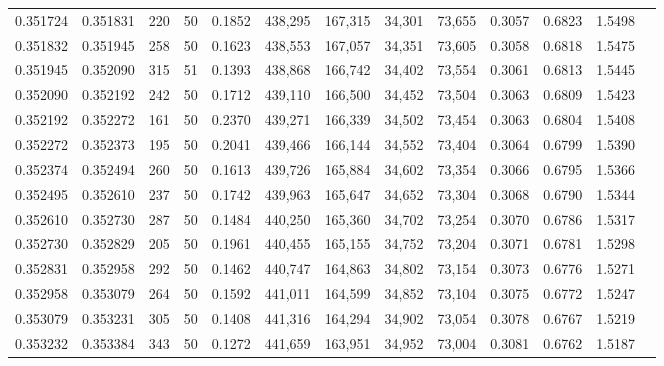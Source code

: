 \begin{tabular}{rrrrrrrrrrrrr}
0.351724 & 0.351831 &   220 &  50 &                                     0.1852 & 438,295 & 167,315 &  34,301 &  73,655 & 0.3057 & 0.6823 & 1.5498 \\
0.351832 & 0.351945 &   258 &  50 &                                     0.1623 & 438,553 & 167,057 &  34,351 &  73,605 & 0.3058 & 0.6818 & 1.5475 \\
0.351945 & 0.352090 &   315 &  51 &                                     0.1393 & 438,868 & 166,742 &  34,402 &  73,554 & 0.3061 & 0.6813 & 1.5445 \\
0.352090 & 0.352192 &   242 &  50 &                                     0.1712 & 439,110 & 166,500 &  34,452 &  73,504 & 0.3063 & 0.6809 & 1.5423 \\
0.352192 & 0.352272 &   161 &  50 &                                     0.2370 & 439,271 & 166,339 &  34,502 &  73,454 & 0.3063 & 0.6804 & 1.5408 \\
0.352272 & 0.352373 &   195 &  50 &                                     0.2041 & 439,466 & 166,144 &  34,552 &  73,404 & 0.3064 & 0.6799 & 1.5390 \\
0.352374 & 0.352494 &   260 &  50 &                                     0.1613 & 439,726 & 165,884 &  34,602 &  73,354 & 0.3066 & 0.6795 & 1.5366 \\
0.352495 & 0.352610 &   237 &  50 &                                     0.1742 & 439,963 & 165,647 &  34,652 &  73,304 & 0.3068 & 0.6790 & 1.5344 \\
0.352610 & 0.352730 &   287 &  50 &                                     0.1484 & 440,250 & 165,360 &  34,702 &  73,254 & 0.3070 & 0.6786 & 1.5317 \\
0.352730 & 0.352829 &   205 &  50 &                                     0.1961 & 440,455 & 165,155 &  34,752 &  73,204 & 0.3071 & 0.6781 & 1.5298 \\
0.352831 & 0.352958 &   292 &  50 &                                     0.1462 & 440,747 & 164,863 &  34,802 &  73,154 & 0.3073 & 0.6776 & 1.5271 \\
0.352958 & 0.353079 &   264 &  50 &                                     0.1592 & 441,011 & 164,599 &  34,852 &  73,104 & 0.3075 & 0.6772 & 1.5247 \\
0.353079 & 0.353231 &   305 &  50 &                                     0.1408 & 441,316 & 164,294 &  34,902 &  73,054 & 0.3078 & 0.6767 & 1.5219 \\
0.353232 & 0.353384 &   343 &  50 &                                     0.1272 & 441,659 & 163,951 &  34,952 &  73,004 & 0.3081 & 0.6762 & 1.5187 \\

\end{tabular}
